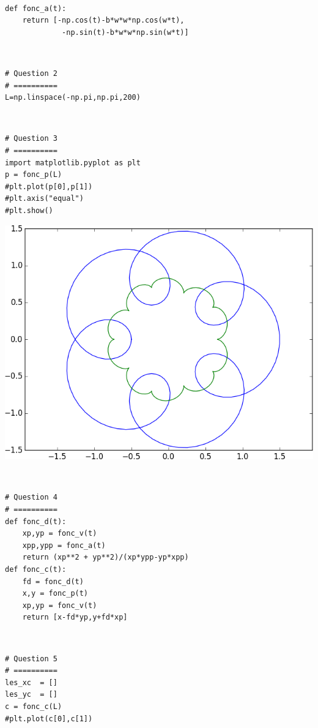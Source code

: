 \documentclass[10pt,fleqn]{article} %
\begin{document}
\begin{corrige}
$\quad$
\begin{lstlisting}
def fonc_a(t):
    return [-np.cos(t)-b*w*w*np.cos(w*t),
    		 -np.sin(t)-b*w*w*np.sin(w*t)]
\end{lstlisting}
\end{corrige}

\begin{corrige}
$\quad$
\begin{lstlisting}
# Question 2
# ==========
L=np.linspace(-np.pi,np.pi,200)
\end{lstlisting}
\end{corrige}

\begin{corrige}
$\quad$
\begin{lstlisting}
# Question 3
# ==========
import matplotlib.pyplot as plt
p = fonc_p(L)
#plt.plot(p[0],p[1])
#plt.axis("equal")
#plt.show()
\end{lstlisting}
\end{corrige}

\begin{center}
\includegraphics[width=.4\linewidth]{programmes/Exercice_12/figure_1}
\end{center}

\begin{corrige}
$\quad$
\begin{lstlisting}
# Question 4
# ==========
def fonc_d(t):
    xp,yp = fonc_v(t)
    xpp,ypp = fonc_a(t)
    return (xp**2 + yp**2)/(xp*ypp-yp*xpp)
def fonc_c(t):
    fd = fonc_d(t)
    x,y = fonc_p(t)
    xp,yp = fonc_v(t)
    return [x-fd*yp,y+fd*xp]
\end{lstlisting}
\end{corrige}

\begin{corrige}
$\quad$
\begin{lstlisting}
# Question 5
# ==========
les_xc  = []
les_yc  = []
c = fonc_c(L)
#plt.plot(c[0],c[1])
\end{lstlisting}
\end{corrige}
\end{document}
